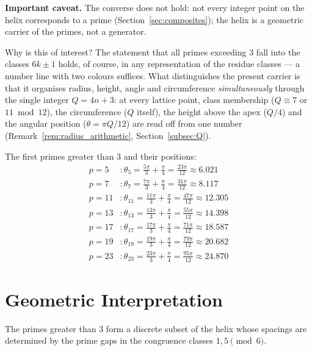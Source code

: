 \textbf{Important caveat.} The converse does not hold: not every integer
point on the helix corresponds to a prime
(Section~\ref{sec:composites}); the helix is a geometric carrier of the
primes, not a generator.



Why is this of interest? The statement that all primes exceeding $3$
fall into the classes $6k \pm 1$ holds, of course, in any representation
of the residue classes --- a number line with two colours suffices. What
distinguishes the present carrier is that it organises radius, height,
angle and circumference \emph{simultaneously} through the single
integer $Q = 4n + 3$: at every lattice point, class membership
($Q \equiv 7$ or $11 \bmod 12$), the circumference ($Q$ itself), the
height above the apex ($Q/4$) and the angular position
($\theta = \pi Q/12$) are read off from one number
(Remark~\ref{rem:radius_arithmetic}, Section~\ref{subsec:Q}).

\begin{example}\label{ex:first-primes}
The first primes greater than 3 and their positions:
\begin{align*}
p = 5 &: \theta_5 = \frac{5\pi}{3} + \frac{\pi}{4} = \frac{23\pi}{12} \approx 6.021\\
p = 7 &: \theta_7 = \frac{7\pi}{3} + \frac{\pi}{4} = \frac{31\pi}{12} \approx 8.117\\
p = 11 &: \theta_{11} = \frac{11\pi}{3} + \frac{\pi}{4} = \frac{47\pi}{12} \approx 12.305\\
p = 13 &: \theta_{13} = \frac{13\pi}{3} + \frac{\pi}{4} = \frac{55\pi}{12} \approx 14.398\\
p = 17 &: \theta_{17} = \frac{17\pi}{3} + \frac{\pi}{4} = \frac{71\pi}{12} \approx 18.587\\
p = 19 &: \theta_{19} = \frac{19\pi}{3} + \frac{\pi}{4} = \frac{79\pi}{12} \approx 20.682\\
p = 23 &: \theta_{23} = \frac{23\pi}{3} + \frac{\pi}{4} = \frac{95\pi}{12} \approx 24.870
\end{align*}
\end{example}

\section{Geometric Interpretation}

\begin{corollary}\label{cor:prime-distribution}
The primes greater than 3 form a discrete subset of the helix whose
spacings are determined by the prime gaps in the congruence classes
$1, 5 \pmod{6}$.
\end{corollary}

